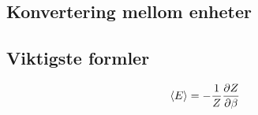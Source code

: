 \documentclass[12pt]{article}
\newcommand{\mean}[1]{\langle #1 \rangle}
\begin{document}
\subsection{Konvertering mellom enheter}

\subsection{Viktigste formler}
\begin{align*}
  \mean{E} = - \frac{1}{Z} \pdv{Z}{\beta}
\end{align*}
\end{document}
